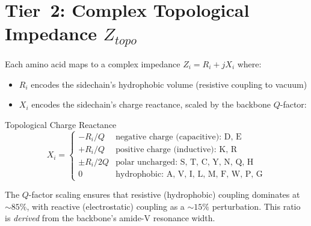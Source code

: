 \section{Tier~2: Complex Topological Impedance $Z_{topo}$}
\label{sec:z_topo_table}

Each amino acid maps to a complex impedance $Z_i = R_i + jX_i$ where:

\begin{itemize}
    \item $R_i$ encodes the sidechain's hydrophobic volume (resistive coupling to vacuum)
    \item $X_i$ encodes the sidechain's charge reactance, scaled by the backbone $Q$-factor:
\end{itemize}

\begin{resultbox}{Topological Charge Reactance}
\begin{equation}
    X_i = \begin{cases}
        -R_i / Q     & \text{negative charge (capacitive): D, E} \\
        +R_i / Q     & \text{positive charge (inductive): K, R} \\
        \pm R_i / 2Q & \text{polar uncharged: S, T, C, Y, N, Q, H} \\
        0            & \text{hydrophobic: A, V, I, L, M, F, W, P, G}
    \end{cases}
    \label{eq:x_charge}
\end{equation}
\end{resultbox}

The $Q$-factor scaling ensures that resistive (hydrophobic) coupling dominates at $\sim 85\%$, with reactive (electrostatic) coupling as a $\sim 15\%$ perturbation.  This ratio is \emph{derived} from the backbone's amide-V resonance width.

